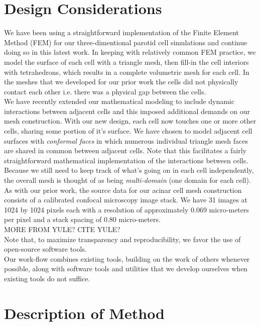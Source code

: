 \documentclass[a4paper,10pt]{article}
\begin{document}
\section{Design Considerations}
We have been using a straightforward implementation of the Finite Element Method (FEM) \cite{gockenbach2006understanding,Hughes2000,gosz2005finite} for our three-dimentional parotid cell simulations and continue doing so in this latest work. In keeping with relatively common FEM practice, we model the surface of each cell with a triangle mesh, then fill-in the cell interiors with tetrahedrons, which results in a complete volumetric mesh for each cell. In the meshes that we developed for our prior work the cells did not physically contact each other i.e. there was a physical gap between the cells.\\

We have recently extended our mathematical modeling to include dynamic interactions between adjacent cells and this imposed additional demands on our mesh construction. With our new design, each cell now touches one or more other cells, sharing some portion of it's surface. We have chosen to model adjacent cell surfaces with \emph{conformal faces} in which numerous individual triangle mesh faces are shared in common between adjacent cells. Note that this facilitates a fairly straightforward mathematical implementation of the interactions between cells. Because we still need to keep track of what's going on in each cell independently, the overall mesh is thought of as being \emph{multi-domain} (one domain for each cell). \\

As with our prior work, the source data for our acinar cell mesh construction consists of a calibrated confocal microscopy image stack. 
We have 31 images at 1024 by 1024 pixels each with a resolution of approximately 0.069 micro-meters per pixel and a stack spacing of 0.80 micro-meters. \\ 

MORE FROM YULE? CITE YULE?\\

Note that, to maximize transparency and reproducibility, we favor the use of open-source software tools.\\
Our work-flow combines existing tools, building on the work of others whenever possible, along with software tools and utilities that we develop ourselves when existing tools do not suffice.\\

\section{Description of Method}
\end{document}
